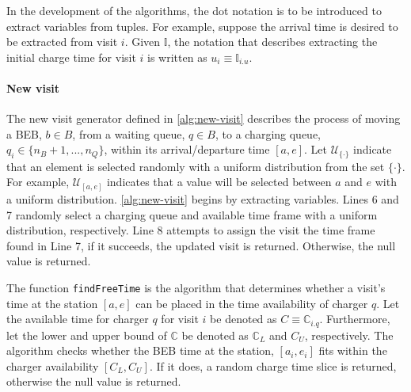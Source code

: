 \documentclass[energies,article,submit,moreauthors]{Definitions/mdpi}
\newcommand{\I}{\mathbb{I}}                 %
\newcommand{\C}{\mathbb{C}}                 %
\newcommand{\U}{\mathcal{U}}                %
\begin{document}
In the development of the algorithms, the dot notation is to be introduced to extract variables from tuples. For
example, suppose the arrival time is desired to be extracted from visit \(i\). Given \(\I\), the notation that describes
extracting the initial charge time for visit \(i\) is written as \(u_i \equiv \I_{i.u}\).

\paragraph{New visit}
\label{sec:new-visit}
The new visit generator defined in \ref{alg:new-visit} describes the process of moving a BEB, \(b \in B\), from a waiting
queue, \(q \in B\), to a charging queue, \(q_i \in \{n_B + 1, ..., n_Q\}\), within its arrival/departure time \([a, e]\). Let
\(\U_{\{\cdot\}}\) indicate that an element is selected randomly with a uniform distribution from the set \(\{\cdot\}\). For
example, \(\U_{[a, e]}\) indicates that a value will be selected between \(a\) and \(e\) with a uniform distribution.
\ref{alg:new-visit} begins by extracting variables. Lines 6 and 7 randomly select a charging queue and available time
frame with a uniform distribution, respectively. Line 8 attempts to assign the visit the time frame found in Line 7, if
it succeeds, the updated visit is returned. Otherwise, the null value is returned.

The function \texttt{findFreeTime} is the algorithm that determines whether a visit's time at the station \([a, e]\) can be placed
in the time availability of charger \(q\). Let the available time for charger \(q\) for visit \(i\) be denoted as \(C \equiv
\C_{i.q}\). Furthermore, let the lower and upper bound of \(\C\) be denoted as \(\C_L\) and \(C_U\), respectively. The
algorithm checks whether the BEB time at the station, \([a_i, e_i]\) fits within the charger availability \([C_L, C_U]\). If
it does, a random charge time slice is returned, otherwise the null value is returned.
\end{document}

